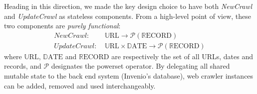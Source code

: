 Heading in this direction, we made the key design choice to have both \emph{NewCrawl} and \emph{UpdateCrawl} as stateless components. From a high-level point of view, these two components are \emph{purely functional}:
%
\newcommand\URL{\mathbb{U}\text{RL}}
\newcommand\DATE{\mathbb{D}\text{ATE}}
\newcommand\RECORD{\mathbb{R}\text{ECORD}}
\begin{equation*}
  \begin{split}
    NewCrawl:    &~ \URL \rightarrow \mathcal{P}(\RECORD)\\
    UpdateCrawl: &~ \URL \times \DATE \rightarrow \mathcal{P}(\RECORD)
  \end{split}
\end{equation*}
%
where $\URL$, $\DATE$ and $\RECORD$ are respectively the set of all URLs, dates and records, and $\mathcal{P}$ designates the powerset operator. By delegating all shared mutable state to the back end system (Invenio's database), web crawler instances can be added, removed and used interchangeably.
